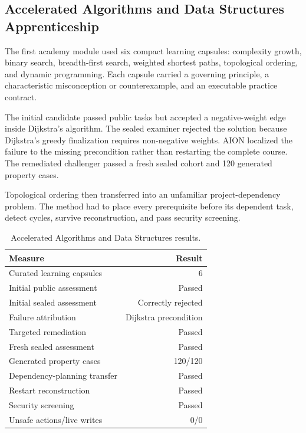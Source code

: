 \subsection{Accelerated Algorithms and Data Structures Apprenticeship}
\label{subsec:accelerated-algorithms-apprenticeship}

The first academy module used six compact learning capsules: complexity growth,
binary search, breadth-first search, weighted shortest paths, topological
ordering, and dynamic programming.  Each capsule carried a governing principle,
a characteristic misconception or counterexample, and an executable practice
contract.

The initial candidate passed public tasks but accepted a negative-weight edge
inside Dijkstra's algorithm.  The sealed examiner rejected the solution because
Dijkstra's greedy finalization requires non-negative weights.  AION localized
the failure to the missing precondition rather than restarting the complete
course.  The remediated challenger passed a fresh sealed cohort and 120
generated property cases.

Topological ordering then transferred into an unfamiliar project-dependency
problem.  The method had to place every prerequisite before its dependent task,
detect cycles, survive reconstruction, and pass security screening.

\begin{table}[htbp]
\centering
\caption{Accelerated Algorithms and Data Structures results.}
\label{tab:accelerated-algorithms-results}
\begin{tabular}{@{}lr@{}}
\toprule
Measure & Result \\
\midrule
Curated learning capsules & 6 \\
Initial public assessment & Passed \\
Initial sealed assessment & Correctly rejected \\
Failure attribution & Dijkstra precondition \\
Targeted remediation & Passed \\
Fresh sealed assessment & Passed \\
Generated property cases & 120/120 \\
Dependency-planning transfer & Passed \\
Restart reconstruction & Passed \\
Security screening & Passed \\
Unsafe actions/live writes & 0/0 \\
\bottomrule
\end{tabular}
\end{table}

